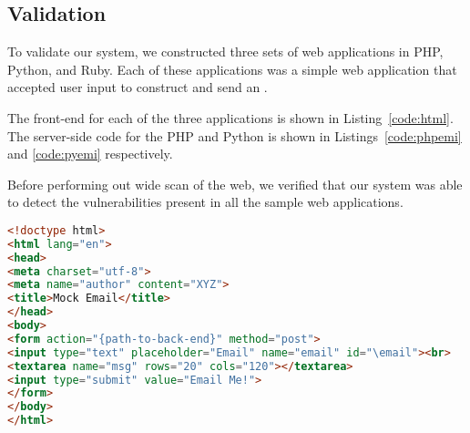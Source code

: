 \subsection{Validation}
To validate our system, we constructed three sets of web applications in PHP, Python, and Ruby. Each of these applications was a simple web application that accepted user input to construct and send an \Email.

The front-end for each of the three applications is shown in Listing~\ref{code:html}. The server-side code for the PHP and Python is shown in Listings~\ref{code:phpemi} and \ref{code:pyemi} respectively.


Before performing out wide scan of the web, we verified that our system was able to detect the \ehi vulnerabilities present in all the sample web applications. 



\begin{lstlisting}[language=HTML,caption={HTML page for showcasing
      \ehi, a simple front-end for our
      examples.},label={code:html}, float]
<!doctype html>
<html lang="en">
<head>
<meta charset="utf-8">
<meta name="author" content="XYZ">
<title>Mock Email</title>
</head>
<body>
<form action="{path-to-back-end}" method="post">
<input type="text" placeholder="Email" name="email" id="\email"><br>
<textarea name="msg" rows="20" cols="120"></textarea>
<input type="submit" value="Email Me!">
</form>
</body>
</html>
\end{lstlisting}

